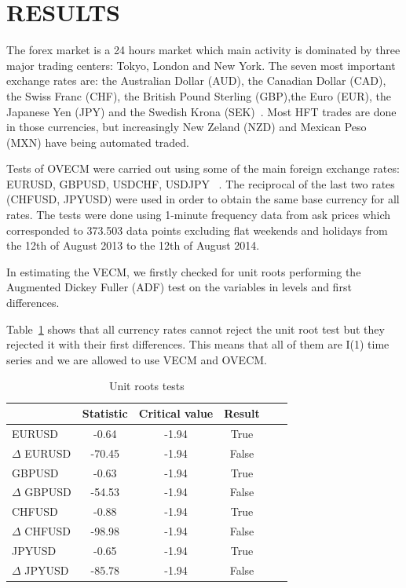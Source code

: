 \section{\uppercase{Results}}
\label{sec:results}
\noindent The forex market is a 24 hours market which main activity is
dominated by three major trading centers: Tokyo, London and New York. The seven
most important exchange rates are: the Australian Dollar (AUD), the Canadian
Dollar (CAD), the Swiss Franc (CHF), the British Pound Sterling (GBP),the Euro
(EUR), the Japanese Yen (JPY) and the Swedish Krona (SEK)~\cite{HaugetAl2000}.
Most HFT trades are done in those currencies, but increasingly New Zeland (NZD)
and Mexican Peso (MXN) have being automated traded.

Tests of OVECM were carried out using some of the main foreign exchange rates:
EURUSD, GBPUSD, USDCHF, USDJPY ~\cite{Dukascopy2014}. The reciprocal of the last
two rates (CHFUSD, JPYUSD) were used in order to obtain the same base currency
for all rates.  The tests were done using 1-minute frequency data from ask
prices which corresponded to 373.503 data points excluding flat weekends and
holidays from the 12th of August 2013 to the 12th of August 2014.

In estimating the VECM, we firstly checked for unit roots performing the
Augmented Dickey Fuller (ADF) test on the variables in levels and first
differences.

Table~\ref{tab:adf} shows that all currency rates cannot reject the unit root
test but they rejected it with their first differences. This means that all of
them are I(1) time series and we are allowed to use VECM and OVECM.


\begin{table}[h!]
\caption{Unit roots tests}
\label{tab:adf}
\begin{center}
\begin{tabular}{|l|c|c|c|c|c|}
\hline
& \textbf{Statistic} & \textbf{Critical value} & \textbf{Result}\\
\hline
EURUSD          & -0.64 & -1.94 & True       \\
$\Delta$ EURUSD & -70.45   & -1.94 & False       \\
GBPUSD          & -0.63   & -1.94 & True          \\
$\Delta$ GBPUSD & -54.53   & -1.94 & False       \\
CHFUSD          & -0.88   & -1.94 & True         \\
$\Delta$ CHFUSD & -98.98   & -1.94 & False       \\
JPYUSD          & -0.65 & -1.94 & True        \\
$\Delta$ JPYUSD & -85.78 & -1.94 & False     \\ 
\hline
\end{tabular}
\end{center}
\end{table}


